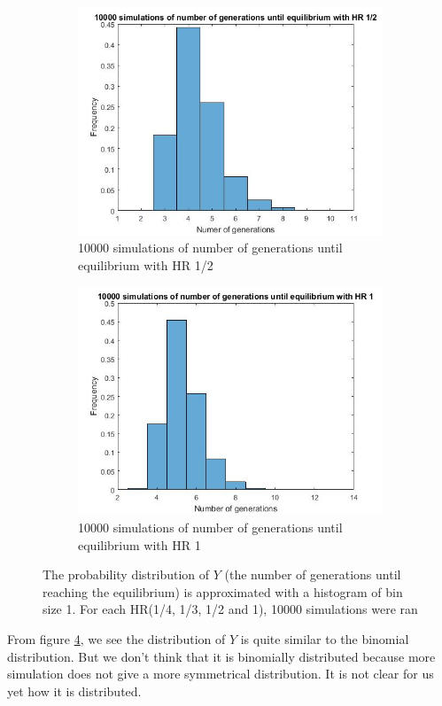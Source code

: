 \begin{figure}[H]
\begin{subfigure}{0.4\textwidth}
        \label{fig:tiger}
    \end{subfigure}
    ~ %
    \begin{subfigure}{0.4\textwidth}
        \includegraphics[width=\textwidth]{GenormHistogramAantalgen2}
        \caption{10000 simulations of number of generations until equilibrium with HR 1/2}
        \label{minimal happiness 1}
    \end{subfigure}
    \begin{subfigure}{0.4\textwidth}
        \includegraphics[width=\textwidth]{GenormHistogramAantalgen1}
        \caption{10000 simulations of number of generations until equilibrium with HR 1}
        \label{minimal happiness 1}
    \end{subfigure}
    \caption{The probability distribution of $Y$ (the number of generations until reaching the equilibrium) is approximated with a histogram of bin size 1. For each HR(1/4, 1/3, 1/2 and 1), 10000 simulations were ran}\label{fig:histogram}
\end{figure}

From figure \ref{fig:histogram}, we see the distribution of $Y$ is quite similar to the binomial distribution. But we don't think that it is binomially distributed because more simulation does not give a more symmetrical distribution. It is not clear for us yet how it is distributed.